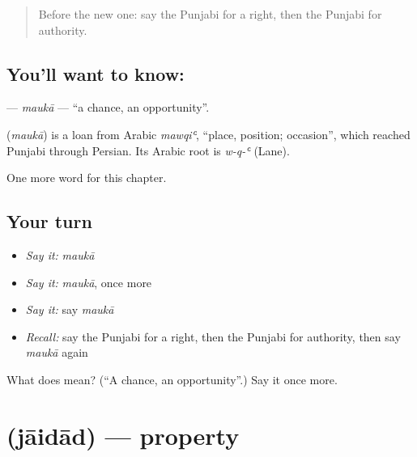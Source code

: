 \label{lesson:PA-C110-mauka}



\begin{quote}
Before the new one: say the Punjabi for a right, then the Punjabi for authority.
\end{quote}

\subsection*{You'll want to know: }
\textbf{} — \emph{maukā} — \textquotedblleft{}a chance, an opportunity\textquotedblright{}.

\begin{cousinweb}
\textbf{} (\emph{maukā}) is a loan from Arabic \emph{mawqiʿ}, \textquotedblleft{}place, position; occasion\textquotedblright{}, which reached Punjabi through Persian. Its Arabic root is \emph{w-q-ʿ} (Lane).
\end{cousinweb}

\begin{grammarlens}[title={What you've built}]
One more word for this chapter.
\end{grammarlens}

\subsection*{Your turn}
\begin{itemize}
\raggedright
  \item \emph{Say it:} \emph{maukā}
  \item \emph{Say it:} \emph{maukā}, once more
  \item \emph{Say it:} say \emph{maukā}
  \item \emph{Recall:} say the Punjabi for a right, then the Punjabi for authority, then say \emph{maukā} again
\end{itemize}

\begin{tcolorbox}[breakable,colback=teal!4,colframe=teal!35!black,title={Before you move on}]
What does  mean? (\textquotedblleft{}A chance, an opportunity\textquotedblright{}.) Say it once more.
\end{tcolorbox}
\section[\texorpdfstring{\pa{ਜਾਇਦਾਦ} (jāidād)}{ਜਾਇਦਾਦ (jāidād)}]{ (jāidād) — property}

